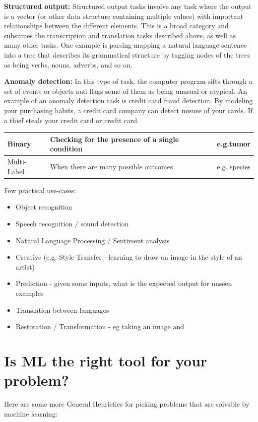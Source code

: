 \documentclass[openany]{book}
\begin{document}
\textbf{Structured output:} Structured output tasks involve any task where the output is a vector (or other data structure containing multiple values) with important relationships between the different elements. This is a broad category and subsumes the transcription and translation tasks described above, as well as many other tasks. One example is parsing-mapping a natural language sentence into a tree that describes its grammatical structure by tagging nodes of the trees as being verbs, nouns, adverbs, and so on.

\textbf{Anomaly detection:} In this type of task, the computer program sifts through a set of events or objects and flags some of them as being unusual or atypical. An example of an anomaly detection task is credit card fraud detection. By modeling your purchasing habits, a credit card company can detect misuse of your cards. If a thief steals your credit card or credit card.

\begin{tabular}{|l|l|l|}
\hline Binary & Checking for the presence of a single condition & e.g.tumor \\
\hline Multi-Label & When there are many possible outcomes & e.g. species \\
\hline
\end{tabular}


Few practical use-cases:

\begin{itemize}
    \item Object recognition
    \item Speech recognition / sound detection
    \item Natural Language Processing / Sentiment analysis
    \item Creative (e.g. Style Transfer - learning to draw an image
in the style of an artist)
    \item Prediction - given some inputs, what is the expected output for unseen examples
    \item Translation between languages
    \item Restoration / Transformation - eg taking an image and

\end{itemize}


\section{Is ML the right tool for your problem?}

Here are some more General Heuristics for picking problems that  are solvable by machine learning:
\end{document}
